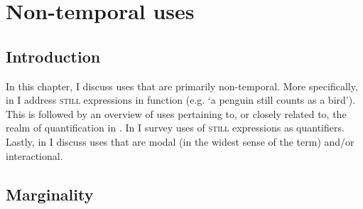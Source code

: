 \chapter{Non-temporal uses}
\label{chapter3}
\section{Introduction}
In this chapter, I discuss uses that are primarily non-temporal. More specifically, in  I address \textsc{still} expressions in  function (e.g. \lq a penguin still counts as a bird\rq{}). This is followed by an overview of uses pertaining to, or closely related to, the realm of   quantification in . In  I survey uses of \textsc{still} expressions as   quantifiers. Lastly, in  I discuss uses that are modal (in the widest sense of the term) and/or interactional.

\section{Marginality}
\label{sectionMarginality}
